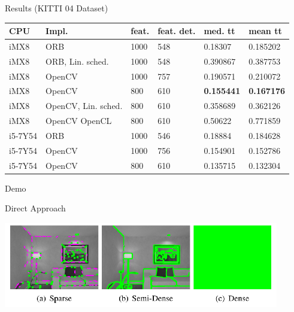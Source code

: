 \documentclass[aspectratio=169]{beamer}
\begin{document}
\begin{frame}{Results (KITTI 04 Dataset)}
  \begin{center}
  \begin{table}
    \begin{tabular}{ l | l | l | l | l | l  }
      \textbf{CPU} & \textbf{Impl.} & \textbf{feat.} & \textbf{feat. det.} & \textbf{med. tt} & \textbf{mean tt} \\ \hline
      iMX8 & ORB & 1000 &  548 & 0.18307 & 0.185202 \\ \hline
      iMX8 & ORB, Lin. sched. & 1000 & 548 & 0.390867 & 0.387753 \\ \hline
      iMX8 & OpenCV & 1000 & 757 & 0.190571 & 0.210072 \\ \hline
      iMX8 & OpenCV & 800 & 610 & \textbf{0.155441} & \textbf{0.167176} \\ \hline
      iMX8 & OpenCV, Lin. sched. & 800 & 610 & 0.358689 & 0.362126 \\ \hline
      iMX8 & OpenCV OpenCL & 800 & 610 & 0.50622 & 0.771859 \\ \hline
      i5-7Y54 & ORB & 1000 & 546 & 0.18884 & 0.184628 \\ \hline
      i5-7Y54 & OpenCV & 1000 & 756 & 0.154901 & 0.152786 \\ \hline
      i5-7Y54 & OpenCV & 800 & 610 & 0.135715 & 0.132304 
    \end{tabular}
  \end{table}
\end{center}
\end{frame}

\note{
}

\begin{frame}{Demo}
  \begin{center}
  \end{center}
\end{frame}

\note{
}

\begin{frame}{Direct Approach}
  \begin{center}
    \includegraphics[width=0.9\textwidth]{./img/sparse_dense.png}
  \end{center}
\end{frame}
\end{document}
